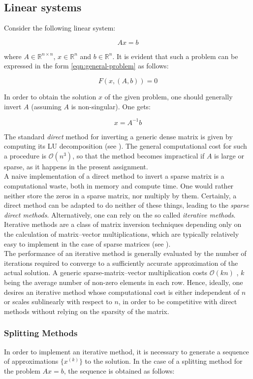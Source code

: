 \documentclass[11pt]{article}
\theoremstyle{theorem}
\theoremstyle{definition}
\begin{document}
\subsection{Linear systems}
Consider the following linear system:

$$Ax=b$$

where $A\in\mathbb{R}^{n\times n}$, $x\in\mathbb{R}^n$ and $b\in\mathbb{R}^n$. It is evident that such a problem can be expressed in the form \eqref{eqn:general-problem} as follows:

$$F(x,(A,b))=0$$ 

In order to obtain the solution $x$ of the given problem, one should generally invert $A$ (assuming $A$ is non-singular). One gets:

$$x=A^{-1}b$$ 

The standard \emph{direct} method for inverting a generic dense matrix is given by computing its LU decomposition (see \cite{lec-notes}). The general computational cost for such a procedure is $\mathcal{O}(n^3)$, so that the method becomes impractical if $A$ is large or sparse, as it happens in the present assignment.\\
A naive implementation of a direct method to invert a sparse matrix is a computational waste, both in memory and compute time. One would rather neither store the zeros in a sparse matrix, nor multiply by them. Certainly, a direct method can be adapted to do neither of these things, leading to the \emph{sparse direct methods}. Alternatively, one can rely on the so called \emph{iterative methods}. Iterative methods are a class of matrix inversion techniques depending only on the calculation of matrix–vector multiplications, which are typically relatively easy to implement in the case of sparse matrices (see \cite{lec-notes}).\\
The performance of an iterative method is generally evaluated by the number of iterations required to converge to a sufficiently accurate approximation of the actual solution. A generic sparse-matrix–vector multiplication costs $\mathcal{O}(kn)$ , $k$ being the average number of non-zero elements in each row. Hence, ideally, one desires an iterative method whose computational cost is either independent of $n$ or scales sublinearly with respect to $n$, in order to be competitive with direct methods without relying on the sparsity of the matrix.\\

\subsubsection{Splitting Methods}
\label{subsubsec:splitting-methods}
In order to implement an iterative method, it is necessary to generate a sequence of approximations $\lbrace x^{(k)}\rbrace$ to the solution. In the case of a splitting method for the problem $Ax=b$, the sequence is obtained as follows:
\end{document}
